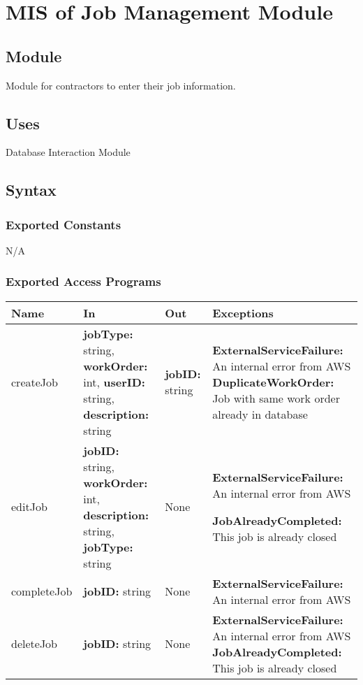 \documentclass[12pt, titlepage]{article}
\begin{document}
\section{MIS of Job Management Module} \label{Module}

\subsection{Module}

Module for contractors to enter their job information.

\subsection{Uses}
Database Interaction Module
\subsection{Syntax}

\subsubsection{Exported Constants}
N/A
\subsubsection{Exported Access Programs}

\begin{center}
  \begin{tabular}{>{\raggedright}p{2cm} >{\raggedright}p{5cm}
    >{\raggedright}p{3cm} p{3cm}}
    \hline
    \textbf{Name} & \textbf{In} & \textbf{Out} & \textbf{Exceptions} \\
    \hline
    createJob & \textbf{jobType:} string, \textbf{workOrder:} int,
    \textbf{userID:} string, \textbf{description:} string &
    \textbf{jobID:} string &  \textbf{ExternalServiceFailure:} An
    internal error from AWS \newline
    \textbf{DuplicateWorkOrder:} Job with same work order already in database \\
    \hline
    editJob & \textbf{jobID:} string, \textbf{workOrder:} int,
    \textbf{description:} string, \textbf{jobType:} string & None &
    \textbf{ExternalServiceFailure:} An internal error from AWS \newline

    \textbf{JobAlreadyCompleted:} This job is already closed\\
    \hline
    completeJob & \textbf{jobID:} string & None &
    \textbf{ExternalServiceFailure:} An internal error from AWS\\
    \hline
    deleteJob & \textbf{jobID:} string & None &
    \textbf{ExternalServiceFailure:} An internal error from AWS \newline
    \textbf{JobAlreadyCompleted:} This job is already closed\\
    \hline
  \end{tabular}
\end{center}
\end{document}
